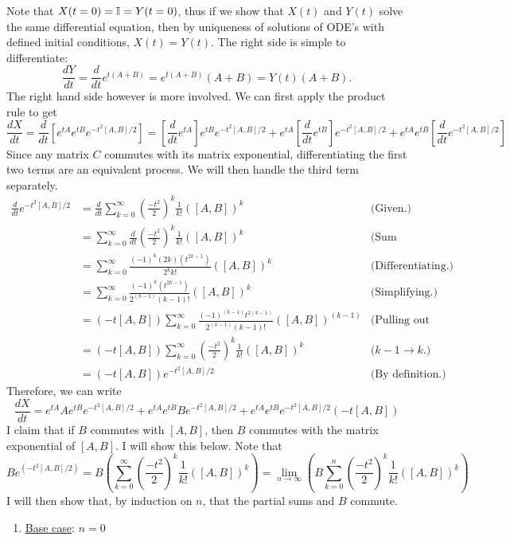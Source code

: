 \begin{solution}
    Note that $X(t = 0) = \mathbb{I} = Y(t = 0)$, thus if we show that $X(t)$ and $Y(t)$ solve the same differential equation, then by uniqueness of solutions of ODE's with defined initial conditions, $X(t) = Y(t)$. The right side is simple to differentiate:
    \[\frac{dY}{dt} = \frac{d}{dt}e^{t(A + B)} = e^{t(A + B)}(A + B) = Y(t)(A + B).\]
    The right hand side however is more involved. We can first apply the product rule to get
    \[\frac{dX}{dt} = \frac{d}{dt}\left[e^{tA}e^{tB}e^{-t^2[A, B]/2}\right] = \left[\frac{d}{dt}e^{tA}\right]e^{tB}e^{-t^2[A, B]/2} + e^{tA}\left[\frac{d}{dt}e^{tB}\right]e^{-t^2[A, B]/2} + e^{tA}e^{tB}\left[\frac{d}{dt}e^{-t^2[A, B]/2}\right]\]
    Since any matrix $C$ commutes with its matrix exponential, differentiating the first two terms are an equivalent process. We will then handle the third term separately.
    \tightalignbreak
    \begin{align*}
        \frac{d}{dt}e^{-t^2[A, B]/2} &= \frac{d}{dt}\sum_{k = 0}^\infty \left( \frac{-t^2}{2}\right)^k \frac{1}{k!} ([A, B])^k &\text{(Given.)}\\
        &= \sum_{k = 0}^\infty \frac{d}{dt}\left( \frac{-t^2}{2}\right)^k \frac{1}{k!} ([A, B])^k &\text{(Sum independent of differentiation.)}\\
        &= \sum_{k = 0}^\infty \frac{(-1)^k (2k)(t^{2k - 1})}{2^k k!} ([A, B])^k &\text{(Differentiating.)}\\
        &= \sum_{k = 0}^\infty \frac{(-1)^k (t^{2k - 1})}{2^{(k-1)} (k-1)!} ([A, B])^k &\text{(Simplifying.)}\\
        &= (-t[A, B])\sum_{k = 0}^\infty \frac{(-1)^{(k-1)} t^{2(k - 1)}}{2^{(k-1)} (k-1)!} ([A, B])^{(k-1)} &\text{(Pulling out extra terms.)}\\
        &= (-t[A, B])\sum_{k = 0}^\infty \left(\frac{-t^{2}}{2}\right)^k\frac{1}{k!} ([A, B])^{k} &\text{($k - 1 \rightarrow k$.)}\\
        &= (-t[A, B])e^{-t^2[A, B]/2} &\text{(By definition.)}
    \end{align*}
    \vspace{-6mm}\alignbreak
    Therefore, we can write 
    \[\frac{dX}{dt} =  e^{tA}Ae^{tB}e^{-t^2[A, B]/2} + e^{tA}e^{tB}Be^{-t^2[A, B]/2} + e^{tA}e^{tB}e^{-t^2[A, B]/2}(-t[A, B])\]
    I claim that if $B$ commutes with $[A, B]$, then $B$ commutes with the matrix exponential of $[A, B]$. I will show this below. Note that 
    \[Be^{(-t^2[A, B]/2)} = B\left( \sum_{k=0}^\infty \left(\frac{-t^2}{2}\right)^k\frac{1}{k!}([A, B])^k \right) = \lim_{n \rightarrow \infty}\left(B \sum_{k=0}^n \left(\frac{-t^2}{2}\right)^k\frac{1}{k!}([A, B])^k\right)\]
    I will then show that, by induction on $n$, that the partial sums and $B$ commute. 
    \tightalignbreak
    \begin{enumerate}[-]
        \item \underline{Base case}: $n = 0$


\end{enumerate}
\end{solution}

